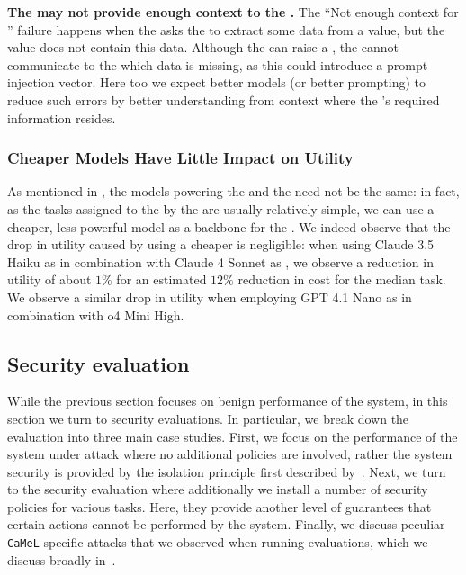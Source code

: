 \documentclass[11pt, a4paper, logo, copyright]{googledeepmind}
\newcommand{\sysname}{\texttt{CaMeL}\xspace}
\begin{document}
\textbf{The \pllm may not provide enough context to the \qllm.} The ``Not enough context for \qllm'' failure happens when the \pllm asks the \qllm to extract some data from a value, but the value does not contain this data. Although the \qllm can raise a , the \qllm cannot communicate to the \pllm which data is missing, as this could introduce a prompt injection vector. Here too we expect better models (or better prompting) to reduce such errors by better understanding from context where the \qllm's required information
resides.



\subsubsection{Cheaper \qllm Models Have Little Impact on Utility}

As mentioned in , the models powering the \pllm and the \qllm need not be the same: in fact, as the tasks assigned to the \qllm by the \pllm are usually relatively simple, we can use a cheaper, less powerful model as a backbone for the \qllm. We indeed observe that the drop in utility caused by using a cheaper \qllm is negligible: when using Claude 3.5 Haiku as \qllm in combination with Claude 4 Sonnet as \pllm, we observe a reduction in utility of about $1\%$ for an estimated $12\%$ reduction in cost for the median task. We observe a similar drop in utility when employing GPT 4.1 Nano as \qllm in combination with o4 Mini High.

\subsection{Security evaluation}
While the previous section focuses on benign performance of the system, in this section we turn to security evaluations. In particular, we break down the evaluation into three main case studies. First, we focus on the performance of the system under attack where no additional policies are involved, rather the system security is provided by the isolation principle first described by~\citet{willison2023dualllm}. Next, we turn to the security evaluation where additionally we install a number of security policies for various tasks. Here, they provide another level of guarantees that certain actions cannot be performed by the system. Finally, we discuss peculiar \sysname{}-specific attacks that we observed when running evaluations, which we discuss broadly in~.
\end{document}
